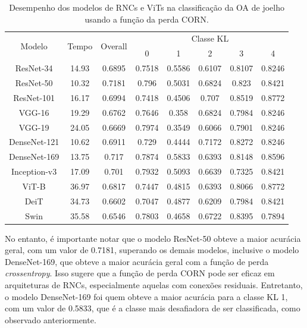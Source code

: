 \begin{table}
    \centering
    \begin{tabular}{|c|c|c|c|c|c|c|c|}
        \hline
        \multirow{2}{*}{Modelo} & \multirow{2}{*}{Tempo} & \multirow{2}{*}{Overall} & \multicolumn{5}{|c|}{Classe KL} \\ \cline{4-8}
        &  &  & 0 & 1 & 2 & 3 & 4 \\ \hline
        ResNet-34 & 14.93 & 0.6895 & 0.7518 & 0.5586 & 0.6107 & 0.8107 & 0.8246 \\ \hline
        ResNet-50 & 10.32 & 0.7181 & 0.796 & 0.5031 & 0.6824 & 0.823 & 0.8421 \\ \hline
        ResNet-101 & 16.17 & 0.6994 & 0.7418 & 0.4506 & 0.707 & 0.8519 & 0.8772 \\ \hline
        VGG-16 & 19.29 & 0.6762 & 0.7646 & 0.358 & 0.6824 & 0.7984 & 0.8246 \\ \hline
        VGG-19 & 24.05 & 0.6669 & 0.7974 & 0.3549 & 0.6066 & 0.7901 & 0.8246 \\ \hline
        DenseNet-121 & 10.62 & 0.6911 & 0.729 & 0.4444 & 0.7172 & 0.8272 & 0.8246 \\ \hline
        DenseNet-169 & 13.75 & 0.717 & 0.7874 & 0.5833 & 0.6393 & 0.8148 & 0.8596 \\ \hline
        Inception-v3 & 17.09 & 0.701 & 0.7932 & 0.5093 & 0.6639 & 0.7325 & 0.8421 \\ \hline
        ViT-B & 36.97 & 0.6817 & 0.7447 & 0.4815 & 0.6393 & 0.8066 & 0.8772 \\ \hline
        DeiT & 34.73 & 0.6602 & 0.7047 & 0.4877 & 0.6209 & 0.7984 & 0.8421 \\ \hline
        Swin & 35.58 & 0.6546 & 0.7803 & 0.4658 & 0.6722 & 0.8395 & 0.7894 \\ \hline
    \end{tabular}
    \caption{Desempenho dos modelos de RNCs e ViTs na classificação da OA de joelho usando a função da perda CORN.}
    \label{tab:resultados-corn}
    \end{table}

No entanto, é importante notar que o modelo ResNet-50 obteve a maior acurácia geral, com um valor de 0.7181, superando os demais modelos, inclusive o modelo DenseNet-169, que obteve a maior acurácia geral com a função de perda \textit{crossentropy}. Isso sugere que a função de perda CORN pode ser eficaz em arquiteturas de RNCs, especialmente aquelas com conexões residuais. Entretanto, o modelo DenseNet-169 foi quem obteve a maior acurácia para a classe KL 1, com um valor de 0.5833, que é a classe mais desafiadora de ser classificada, como observado anteriormente.

